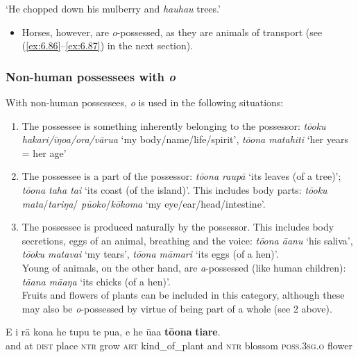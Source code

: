 \glt
‘He chopped down his mulberry and \textit{hauhau} trees.’ \textstyleExampleref{[R352.030]} 
\z
\begin{itemize}
\item[]
Horses, however, are \textit{o}{}-possessed, as they are animals of transport (see (\ref{ex:6.86}–\ref{ex:6.87}) in the next section).
\end{itemize}

\subsubsection[Non{}-human possessees with o]{Non-human possessees with \textit{o}}\label{sec:6.3.3.3}

With non-human possessees, \textit{o} is used in the following situations:

\begin{enumerate}
\item 
The possessee is something inherently belonging to the possessor: \textit{tō{\ꞌ}oku hakari/{\ꞌ}īŋoa/ora/vārua} ‘my body/name/life/spirit’, \textit{tō{\ꞌ}ona matahiti} ‘her years = her age’

\item 
The possessee is a part of the possessor: \textit{tō{\ꞌ}ona raupā} ‘its leaves (of a tree)’; \textit{tō{\ꞌ}ona taha tai} ‘its coast (of the island)’. This includes body parts: \textit{tō{\ꞌ}oku mata}/\textit{tariŋa}/ \mbox{\textit{pū{\ꞌ}oko}}/\textit{kōkoma} ‘my eye/ear/head/intestine’.

\item 
The possessee is produced naturally by the possessor. This includes body secretions, eggs of an animal, breathing and the voice: \textit{tō{\ꞌ}ona {\ꞌ}ā{\ꞌ}anu} ‘his saliva’, \textit{tō{\ꞌ}oku matavai} ‘my tears’, \textit{tō{\ꞌ}ona māmari} ‘its eggs (of a hen)’.\\
Young of animals, on the other hand, are \textit{a}{}-possessed (like human children): \textit{\mbox{tā{\ꞌ}ana} mā{\ꞌ}aŋa} ‘its chicks (of a hen)’.\\
Fruits and flowers of plants can be included in this category, although these may also be \textit{o}\nobreakdash-possessed by virtue of being part of a whole (see 2 above).

\end{enumerate}

\ea\label{ex:6.81}
\gll {\ꞌ}E {\ꞌ}i rā kona he tupu te pua, {\ꞌ}e he {\ꞌ}ūa{\ꞌ}a \textbf{tō{\ꞌ}ona} \textbf{tiare}. \\
and at \textsc{dist} place \textsc{ntr} grow \textsc{art} kind\_of\_plant and \textsc{ntr} blossom \textsc{poss.3sg.o} flower \\

